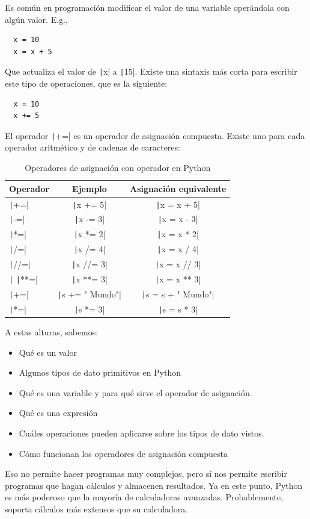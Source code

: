 Es común en programación modificar el valor de una variable operándola con algún valor. E.g.,
\begin{verbatim}
  x = 10
  x = x + 5
\end{verbatim}
Que actualiza el valor de \texttt|x| a \texttt|15|. Existe una sintaxis más corta para escribir este tipo de operaciones, que es la siguiente:
\begin{verbatim}
  x = 10
  x += 5
\end{verbatim}
El operador \texttt|+=| es un operador de asignación compuesta. Existe uno para cada operador aritmético y de cadenas de caracteres:
\begin{table}[h]
\centering
\begin{tabular}{|l|c|c|}
\hline
\textbf{Operador} & \textbf{Ejemplo} & \textbf{Asignación equivalente} \\
\hline
\texttt|+=| & \texttt|x += 5| & \texttt|x = x + 5| \\
\texttt|-=| & \texttt|x -= 3| & \texttt|x = x - 3| \\
\texttt|*=| & \texttt|x *= 2| & \texttt|x = x * 2| \\
\texttt|/=| & \texttt|x /= 4| & \texttt|x = x / 4| \\
\texttt|//=| & \texttt|x //= 3| & \texttt|x = x // 3| \\
\texttt|%
\texttt|**=| & \texttt|x **= 3| & \texttt|x = x ** 3| \\
\texttt|+=| & \texttt|s += " Mundo"| & \texttt|s = s + " Mundo"| \\
\texttt|*=| & \texttt|s *= 3| & \texttt|s = s * 3| \\
\hline
\end{tabular}
\caption{Operadores de asignación con operador en Python}
\label{tab:operadores-asignacion-con-operador}
\end{table}



A estas alturas, sabemos:
\begin{itemize}
  \item Qué es un valor
  \item Algunos tipos de dato primitivos en Python
  \item Qué es una variable y para qué sirve el operador de asignación.
  \item Qué es una expresión 
  \item Cuáles operaciones pueden aplicarse sobre los tipos de dato vistos.
  \item Cómo funcionan los operadores de asignación compuesta
\end{itemize}

Eso no permite hacer programas muy complejos, pero sí nos permite escribir programas que hagan cálculos y almacenen resultados. Ya en este punto, Python es más poderoso que la mayoría de calculadoras avanzadas. Probablemente, soporta cálculos más extensos que su calculadora.